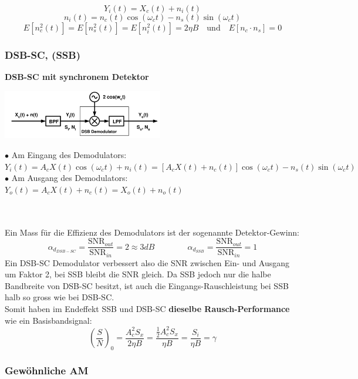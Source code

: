 	$$ Y_i(t) = X_c(t) + n_i(t)$$
	$$n_i(t) = n_c(t) \cos(\omega_c t) - n_s(t) \sin(\omega_c t) $$
	$$ E[n_c^2(t)] = E[n_s^2(t)] = E[n_i^2(t)] = 2 \eta B \quad \text{und} \quad E[n_c\cdot n_s] = 0$$



\subsubsection{DSB-SC, (SSB) }
\textbf{DSB-SC mit synchronem Detektor}\\
\begin{minipage}{7.5cm}
	\includegraphics[width = 7cm]{./bilder/08_Sync_Detektor_DSB}
\end{minipage}
\begin{minipage}{11cm}
  $\bullet$ Am Eingang des Demodulators:\\ 
  \hspace*{0.3cm}$Y_i(t) = A_c X(t) \cos (\omega_c t) + n_i(t) = [A_c X(t) + n_c(t)]\cos(\omega_c t) - n_s(t)\sin(\omega_c t)$\\
  $\bullet$ Am Ausgang des Demodulators:\\ 
  \hspace*{0.3cm} $Y_o(t) = A_c X(t) + n_c(t) = X_o(t) + n_o(t)$
\end{minipage}\\ \\
Ein Mass für die Effizienz des Demodulators ist der sogenannte Detektor-Gewinn: \\
$$ \alpha_{d_{DSB-SC}} = \dfrac{\text{SNR}_{out}}{\text{SNR}_{in}} = 2 \approx 3 dB
\qquad \qquad
 \alpha_{d_{SSB}} = \dfrac{\text{SNR}_{out}}{\text{SNR}_{in}} = 1
$$
Ein DSB-SC Demodulator verbessert also die SNR zwischen Ein- und Ausgang um Faktor 2, bei SSB
bleibt die SNR gleich. Da SSB jedoch nur die halbe Bandbreite von DSB-SC besitzt, ist auch die
Eingangs-Rauschleistung bei SSB halb so gross wie bei DSB-SC. \\
Somit haben im Endeffekt SSB und DSB-SC \textbf{dieselbe Rausch-Performance} wie ein Basisbandsignal: 
	$$ \left(\dfrac{S}{N}\right)_0 =
	\dfrac{A_c^2 S_x}{2 \eta B} = \dfrac{\frac12 A_c^2 S_x}{\eta B} = \dfrac{S_i}{\eta B} = \gamma $$

\subsubsection{Gewöhnliche AM }

